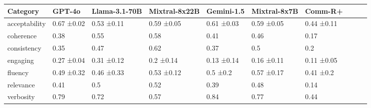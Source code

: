 \begin{tabular}{llllllll|cc}
\toprule
Category & GPT-4o & Llama-3.1-70B & Mixtral-8x22B & Gemini-1.5 & Mixtral-8x7B & Comm-R+ \\
\midrule
acceptability & 0.67 ±0.02 & 0.53 ±0.11 & 0.59 ±0.05 & 0.61 ±0.03 & 0.59 ±0.05 & 0.44 ±0.11 \\
coherence & 0.38  & 0.55  & 0.58  & 0.41  & 0.46  & 0.17  \\
consistency & 0.35  & 0.47  & 0.62  & 0.37  & 0.5  & 0.2  \\
engaging & 0.27 ±0.04 & 0.31 ±0.12 & 0.2 ±0.14 & 0.13 ±0.14 & 0.16 ±0.11 & 0.11 ±0.05 \\
fluency & 0.49 ±0.32 & 0.46 ±0.33 & 0.53 ±0.12 & 0.5 ±0.2 & 0.57 ±0.17 & 0.41 ±0.2 \\
relevance & 0.41  & 0.5  & 0.52  & 0.39  & 0.48  & 0.14  \\
verbosity & 0.79  & 0.72  & 0.57  & 0.84  & 0.77  & 0.44  \\
\bottomrule
\end{tabular}
